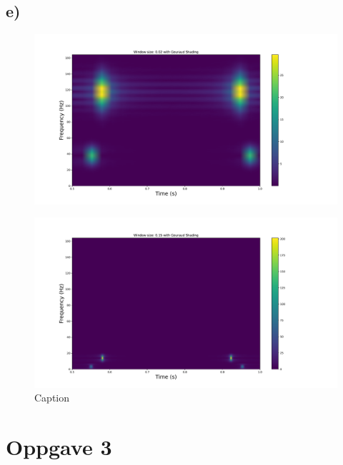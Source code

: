 \documentclass{article}
\begin{document}
\subsection*{e)}
\begin{figure}[h!]
  \centering
  \includegraphics[width = \textwidth]{fig/2.e.1.pdf}
  \caption{}
  \label{fig: 2.e.1}
\end{figure}

\begin{figure}[h!]
  \centering
  \includegraphics[width = \textwidth]{fig/2.e.2.pdf}
  \caption{Caption}
  \label{fig: 2.e.2}
\end{figure}

\newpage
\section*{Oppgave 3}
\end{document}
